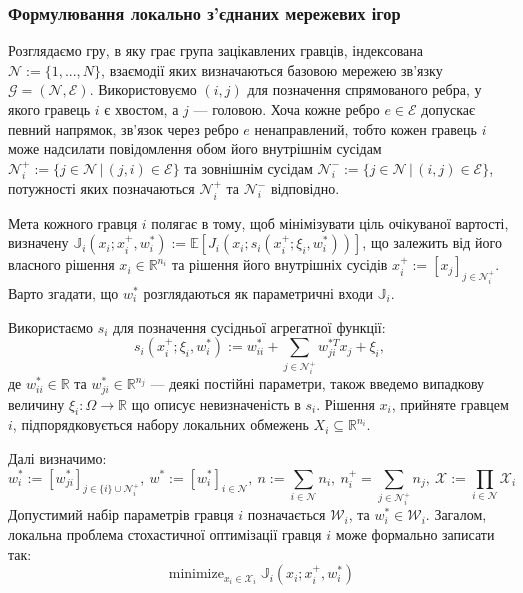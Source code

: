 \documentclass[a4paper]{article}
\begin{document}
\subsubsection{Формулювання локально з’єднаних мережевих ігор}
Розглядаємо гру, в яку грає група зацікавлених гравців, індексована $\mathcal{N} := \{1, . . . , N\}$, взаємодії яких визначаються базовою мережею зв'язку $\mathcal{G} = (\mathcal{N} , \mathcal{E})$. Використовуємо $(i, j)$ для позначення спрямованого ребра, у якого гравець $i$ є хвостом, а $j$ --- головою. Хоча кожне ребро $e \in \mathcal{E}$ допускає певний напрямок, зв'язок через ребро $e$ ненаправлений, тобто кожен гравець $i$ може надсилати повідомлення обом його внутрішнім сусідам $\mathcal{N}_i^+ := \{j \in \mathcal{N}\, | \,(j, i) \in \mathcal{E}\}$ та зовнішнім сусідам $\mathcal{N}_i^- := \{j \in \mathcal{N}\, |\, (i, j) \in \mathcal{E}\}$, потужності яких позначаються $\mathcal{N}_i^+$ та $\mathcal{N}_i^-$ відповідно.

Мета кожного гравця $i$ полягає в тому, щоб мінімізувати ціль очікуваної вартості, визначену $\mathbb{J}_i(x_i; x_i^+, w_i^*) := \mathbb{E}[J_i(x_i; s_i(x_i^+; \xi_i, w_i^*))]$, що залежить від його власного рішення $x_i \in \mathbb {R}^{n_i}$ та рішення його внутрішніх сусідів $x_i^+ := [x_j]_{j\in \mathcal{N}_i^+}$. Варто згадати, що $w_i^*$ розглядаються як параметричні входи $\mathbb{J}_i$.

Використаємо $s_i$ для позначення сусідньої агрегатної функції: $$s_i(x_i^+; \xi_i, w_i^*) := w_{ii}^* + \sum_{j\in \mathcal{N}_i^+} w_{ji}^{*T} x_j + \xi_i,$$ де $w_{ii}^* \in \mathbb{R}$ та $w_{ji}^* \in \mathbb {R}^{n_j}$ — деякі постійні параметри, також введемо випадкову величину $\xi_i: \Omega \rightarrow \mathbb{R}$ що описує невизначеність в $s_i$. Рішення $x_i$, прийняте гравцем $i$, підпорядковується набору локальних обмежень $X_i \subseteq \mathbb {R}^{n_i}$. 

Далі визначимо: $$w_{i}^{*}:=\left[w_{j i}^{*}\right]_{j \in\{i\} \cup \mathcal{N}_{i}^{+}},\: w^{*}:=\left[w_{i}^{*}\right]_{i \in \mathcal{N}},\: n:=\sum_{i \in \mathcal{N}} n_{i},\: n_{i}^{+}=\sum_{j \in \mathcal{N}_{i}^{+}} n_{j},\: \mathcal{X}:=\prod_{i \in \mathcal{N}} \mathcal{X}_{i}$$ Допустимий набір параметрів гравця $i$ позначається $\mathcal{W}_{i}$, та $w_{i}^{*} \in \mathcal{W}_{i}$. Загалом, локальна проблема стохастичної оптимізації гравця $i$ може формально записати так:
\begin{equation}\label{sne}
    \operatorname{minimize}_{x_{i} \in \mathcal{X}_{i}} \mathbb{J}_{i}\left(x_{i} ; x_{i}^{+}, w_{i}^{*}\right)
\end{equation}
\end{document}

